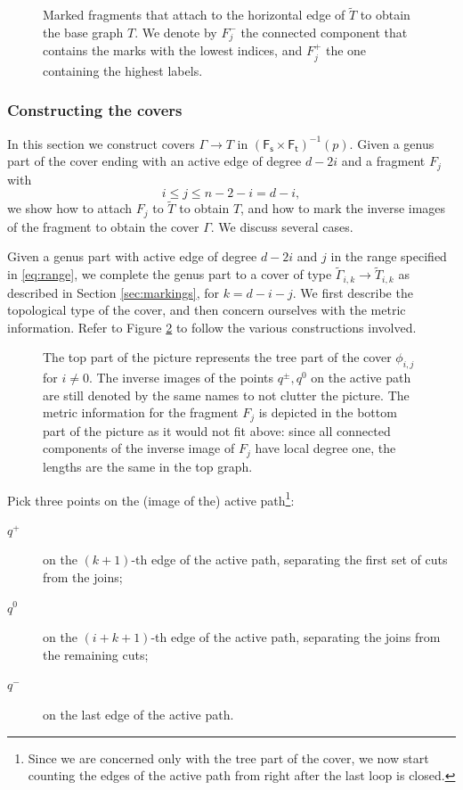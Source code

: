 \documentclass[11pt,reqno]{amsart}
\newcommand{\inputTikZ}[2]{%
     \resizebox{#1}{!}{}}
\theoremstyle{definition}
\newcommand{\Ft}{\mathsf{F_t}}
\newcommand{\Fs}{\mathsf{F_s}}
\begin{document}
\begin{figure}
    \centering
    \inputTikZ{\textwidth}{Figures/fragments}
    \caption{Marked fragments that attach to the horizontal edge of $\tilde{T}$ to obtain the base graph $T$. We denote by $F_j^-$ the connected component that contains the marks with the lowest indices, and $F_j^+$  the one containing the highest labels.}
    \label{fig:markfrag}
\end{figure}


\subsubsection*{Constructing the covers}

In this section we construct covers $\Gamma \to T$ in $(\Fs\times \Ft)^{-1}(p)$. Given a genus part of the cover ending with an active edge of degree $d-2i$ and a fragment $F_j$ with \begin{equation}\label{eq:range}
  i \leq j \leq n-2-i = d-i,  
\end{equation}  we show how to attach $F_j$ to $\tilde{T}$ to obtain $T$, and how to mark the inverse images of the fragment to obtain the cover $\Gamma$. We discuss several cases.

  Given a genus part with active edge of degree $d-2i$ and $j$ in the range specified in \eqref{eq:range}, we complete the genus part to a cover of type $\tilde{\Gamma}_{i,k}\to \tilde{T}_{i,k}$ as described in Section \ref{sec:markings}, for $k = d-i-j$. We first describe the topological type of the cover, and then concern ourselves with the metric information. Refer to  Figure \ref{fig:gensol} to follow the various constructions involved.

\begin{figure}[tb]
    \centering
    \inputTikZ{1\textwidth}{Figures/generalsol}
    \caption{The top part of the picture represents the tree part of the cover $\phi_{i,j}$ for $i\not=0$. The inverse images of the points $q^\pm,q^0$ on the active path are still denoted by the same names to not clutter the picture. The metric information for the fragment $F_j$ is depicted in the bottom part of the picture as it would not fit above: since all connected components of the inverse image of $F_j$ have local degree one, the lengths are the same in the top graph.}
    \label{fig:gensol}
\end{figure}


 Pick three points on the (image of the) active path\footnote{Since we are concerned only with the tree part of the cover, we now start counting the edges of the active path from right after the last loop is closed.}:
\begin{description}
    \item[$q^+$] on the $(k+1)$-th edge of the active path, separating the first set of cuts from the joins;
    \item[$q^0$] on the $(i+k+1)$-th edge of the active path, separating the joins from the remaining cuts;
    \item[$q^-$] on the last edge of the active path.
    \end{description}
\end{document}
